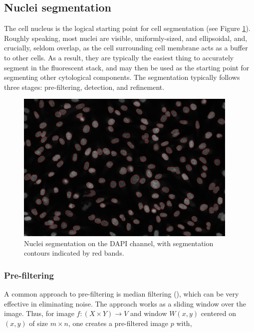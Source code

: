 \subsection{Nuclei segmentation}

The cell nucleus is the logical starting point for cell segmentation (see Figure \ref{fig:segmentation}). Roughly speaking, most nuclei are visible, uniformly-sized, and ellipsoidal, and, crucially, seldom overlap, as the cell surrounding cell membrane acts as a buffer to other cells. As a result, they are typically the easiest thing to accurately segment in the fluorescent stack, and may then be used as the starting point for segmenting other cytological components. The segmentation typically follows three stages: pre-filtering, detection, and refinement.

\begin{figure}[ht]
\centering
\includegraphics[width=0.95\textwidth]{img/segmentation.png}
\caption{Nuclei segmentation on the DAPI channel, with segmentation contours indicated by red bands.}
\label{fig:segmentation}
\end{figure}

\subsubsection{Pre-filtering}

A common approach to pre-filtering is median filtering (\cite{huang1979fast}), which can be very effective in eliminating noise. The approach works as a sliding window over the image. Thus, for image $f: (X \times Y) \to V$ and window $W(x, y)$ centered on $(x, y)$ of size $m\times n$, one creates a pre-filtered image $p$ with,

